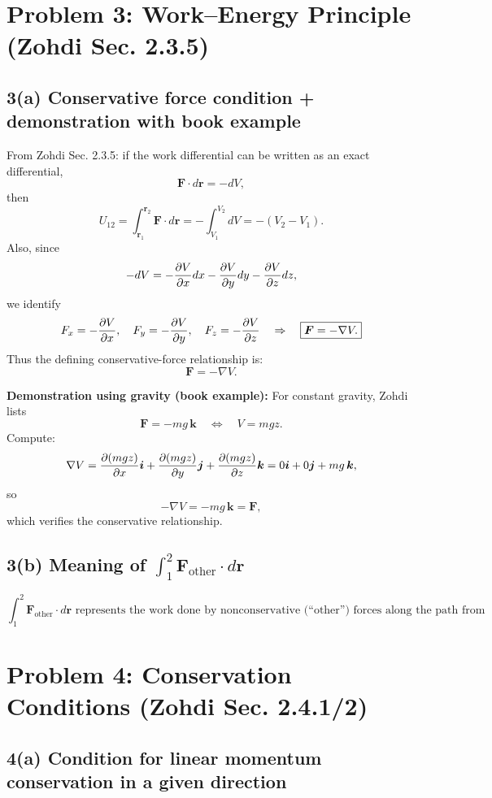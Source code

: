 \documentclass[12pt]{article}
\begin{document}
\newpage
\section*{Problem 3: Work--Energy Principle (Zohdi Sec. 2.3.5)}

\subsection*{3(a) Conservative force condition + demonstration with book example}

From Zohdi Sec. 2.3.5: if the work differential can be written as an exact differential,
\[
\bm F\cdot d\bm r = -dV,
\]
then
\[
U_{12} = \int_{\bm r_1}^{\bm r_2} \bm F\cdot d\bm r
       = -\int_{V_1}^{V_2} dV
       = -(V_2 - V_1).
\]
Also, since
\[
-dV = -\pdv{V}{x}dx - \pdv{V}{y}dy - \pdv{V}{z}dz,
\]
we identify
\[
F_x = -\pdv{V}{x},\quad F_y=-\pdv{V}{y},\quad F_z=-\pdv{V}{z}
\quad\Rightarrow\quad
\boxed{\bm F = -\nabla V.}
\]
Thus the defining conservative-force relationship is:
\[
\boxed{\bm F=-\nabla V.}
\]

\textbf{Demonstration using gravity (book example):}
For constant gravity, Zohdi lists
\[
\bm F = -mg\,\bm k \quad \Longleftrightarrow \quad V = mgz.
\]
Compute:
\[
\nabla V = \pdv{(mgz)}{x}\bm i + \pdv{(mgz)}{y}\bm j + \pdv{(mgz)}{z}\bm k
= 0\bm i + 0\bm j + mg\,\bm k,
\]
so
\[
-\nabla V = -mg\,\bm k = \bm F,
\]
which verifies the conservative relationship.

\subsection*{3(b) Meaning of $\int_1^2 \bm F_{\text{other}}\cdot d\bm r$}

\[
\boxed{
\int_{1}^{2} \bm F_{\text{other}}\cdot d\bm r
\text{ represents the work done by nonconservative (``other'') forces along the path from 1 to 2.}
}
\]

\newpage
\section*{Problem 4: Conservation Conditions (Zohdi Sec. 2.4.1/2)}

\subsection*{4(a) Condition for linear momentum conservation in a given direction}
\end{document}
